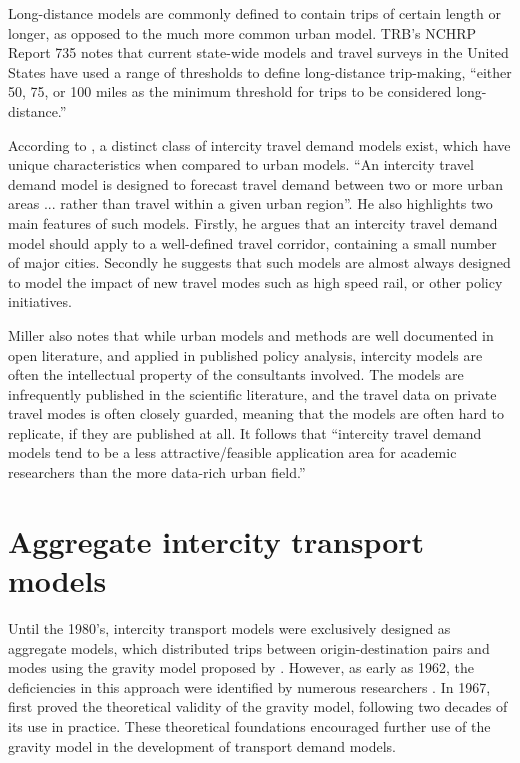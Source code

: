 Long-distance models are commonly defined to contain trips of certain length or longer, as opposed to the much more common urban model. TRB's NCHRP Report 735 notes that current state-wide models and travel surveys in the United States have used a range of thresholds to define long-distance trip-making, \enquote{either 50, 75, or 100 miles as the minimum threshold for trips to be considered long-distance.}\autocite{schif12}

According to \textcite{miller04}, a distinct class of intercity travel demand models exist, which have unique characteristics when compared to urban models. \enquote{An intercity travel demand model is designed to forecast travel demand between two or more urban areas ... rather than travel within a given urban region}. He also highlights two main features of such models. Firstly, he argues that an intercity travel demand model should apply to a well-defined travel corridor, containing a small number of major cities. Secondly he suggests that such models are almost always designed to model the impact of new travel modes such as high speed rail, or other policy initiatives.

Miller also notes that while urban models and methods are well documented in open literature, and applied in published policy analysis, intercity models are often the intellectual property of the consultants involved. The models are infrequently published in the scientific literature, and the travel data on private travel modes is often closely guarded, meaning that the models are often hard to replicate, if they are published at all. It follows that \enquote{intercity travel demand models tend to be a less attractive/feasible application area for academic researchers than the more data-rich urban field.} \parencite{miller04}

\section{Aggregate intercity transport models}

Until the 1980’s, intercity transport models were exclusively designed as aggregate models, which distributed trips between origin-destination pairs and modes using the gravity model proposed by \autocite{casey55}. However, as early as 1962, the deficiencies in this approach were identified by numerous researchers \autocite*{OiSchu62, Warner62}. In 1967, \autocite{Wilson67} first proved the theoretical validity of the gravity model, following two decades of its use in practice. These theoretical foundations encouraged further use of the gravity model in the development of transport demand models. 

